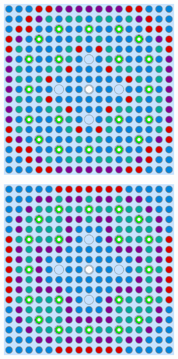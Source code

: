 \begin{appendices}
\begin{figure}[h!]
\begin{subfigure}{0.48\textwidth}
  \includegraphics[width=0.95\linewidth]{figures/unsupervised/geometries/dimension-reduce/assm-31-20BPs/pca}
  \caption{}
  \label{fig:assm-31-20BPs-combined-pca-2}
\end{subfigure}
\begin{subfigure}{0.48\textwidth}
  \centering
  \includegraphics[width=0.95\linewidth]{figures/unsupervised/geometries/dimension-reduce/assm-31-20BPs/ica}

\end{subfigure}
\end{figure}
\end{appendices}
